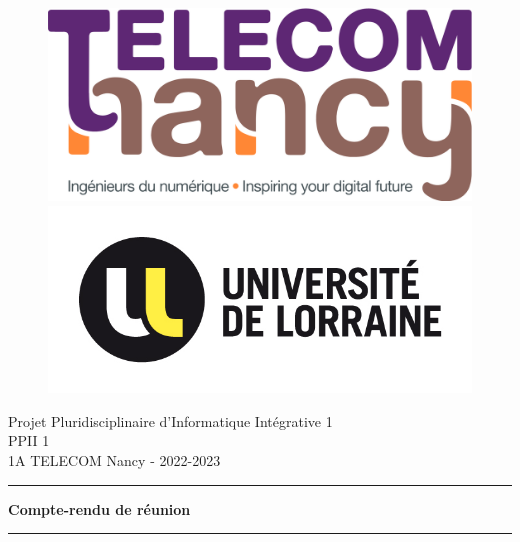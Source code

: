 \thispagestyle{empty}

\begin{figure}[h!]
    \centering
    \includegraphics[scale = 0.1]{front_page/logoTNCY.png}
    \vskip 1cm
    \includegraphics[scale = 1.5]{front_page/logo_UL.jpg}
    \label{fig:logo_telecomnancy}
\end{figure}

\vskip 1.5cm

\begin{center}

    \begin{Large}
        Projet Pluridisciplinaire d’Informatique Intégrative 1\\
        PPII 1\\
        1A TELECOM Nancy - 2022-2023\\
    \end{Large}
    
    \vskip 1.5cm
    
    \hrule
    
    \vskip 1.5cm
    
    \begin{Huge}
        \textbf{Compte-rendu de réunion}
    \end{Huge}
    
    \vskip 0.25cm
    
    \begin{LARGE}
        \setdate
    \end{LARGE}
    
    \vskip 1.5cm
    
    \hrule
    
\end{center}